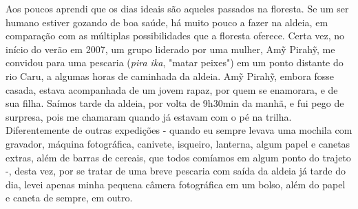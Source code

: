 Aos poucos aprendi que os dias ideais são aqueles passados na floresta.
Se um ser humano estiver gozando de boa saúde, há muito pouco a fazer na
aldeia, em comparação com as múltiplas possibilidades que a floresta
oferece. Certa vez, no início do verão em 2007, um grupo liderado por
uma mulher, Amỹ Pirahỹ, me convidou para uma pescaria (\emph{pira ika},
"matar peixes") em um ponto distante do rio Caru, a algumas horas de
caminhada da aldeia. Amỹ Pirahỹ, embora fosse casada, estava acompanhada
de um jovem rapaz, por quem se enamorara, e de sua filha. Saímos tarde
da aldeia, por volta de 9h30min da manhã, e fui pego de surpresa, pois
me chamaram quando já estavam com o pé na trilha. Diferentemente de
outras expedições - quando eu sempre levava uma mochila com gravador,
máquina fotográfica, canivete, isqueiro, lanterna, algum papel e canetas
extras, além de barras de cereais, que todos comíamos em algum ponto do
trajeto -, desta vez, por se tratar de uma breve pescaria com saída da
aldeia já tarde do dia, levei apenas minha pequena câmera fotográfica em
um bolso, além do papel e caneta de sempre, em outro.

